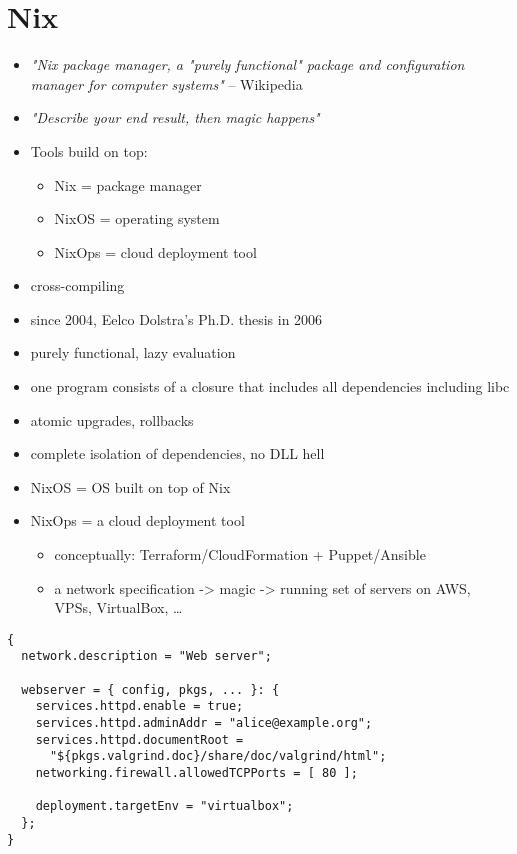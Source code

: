 \documentclass[english,odsaz]{fitthesis}
\begin{document}
\section{Nix}
\label{sec:org6d3bbd4}
\begin{itemize}
\item \emph{"Nix package manager, a "purely functional" package and configuration
manager for computer systems"} -- Wikipedia
\item \emph{"Describe your end result, then magic happens"}
\item Tools build on top:
\begin{itemize}
\item Nix = package manager
\item NixOS = operating system
\item NixOps = cloud deployment tool
\end{itemize}
\item cross-compiling

\item since 2004, Eelco Dolstra's Ph.D. thesis in 2006
\item purely functional, lazy evaluation
\item one program consists of a closure that includes all dependencies including libc
\item atomic upgrades, rollbacks
\item complete isolation of dependencies, no DLL hell
\item NixOS = OS built on top of Nix
\item NixOps = a cloud deployment tool
\begin{itemize}
\item conceptually: Terraform/CloudFormation + Puppet/Ansible
\item a network specification -> magic -> running set of servers on AWS, VPSs,
VirtualBox, \ldots{}
\end{itemize}
\end{itemize}

\begin{verbatim}
{
  network.description = "Web server";

  webserver = { config, pkgs, ... }: {
    services.httpd.enable = true;
    services.httpd.adminAddr = "alice@example.org";
    services.httpd.documentRoot =
      "${pkgs.valgrind.doc}/share/doc/valgrind/html";
    networking.firewall.allowedTCPPorts = [ 80 ];

    deployment.targetEnv = "virtualbox";
  };
}
\end{verbatim}
\end{document}
